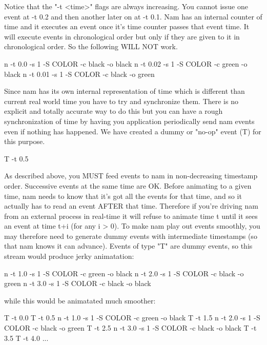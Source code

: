 Notice that the "-t <time>" flags are always increasing.  You cannot
issue one event at -t 0.2 and then another later on at -t 0.1.  Nam has
an internal counter of time and it executes an event once it's time
counter passes that event time.  It will execute events in chronological
order but only if they are given to it in chronological order.  So the
following WILL NOT work.
\begin{program}
n -t 0.0 -s 1 -S COLOR -c black -o black
n -t 0.02 -s 1 -S COLOR -c green -o black
n -t 0.01 -s 1 -S COLOR -c black -o green
\end{program}

Since nam has its own internal representation of time which is different
than current real world time you have to try and synchronize them.
There is no explicit and totally accurate way to do this but you can
have a rough synchronization of time by having you application
periodically send nam events even if nothing has happened. We have 
created a dummy or "no-op" event (T) for this purpose.
\begin{program}
T -t 0.5
\end{program}

As described above, you MUST feed events to nam in non-decreasing
timestamp order. Successive events at the same time are OK. 
Before animating to a given time, nam needs to know that it's got all
the events for that time, and so it actually has to read an event
AFTER that time.  Therefore if you're driving nam from an external
process in real-time it will refuse to animate time t until it sees an
event at time t+i (for any i > 0).  To make nam play out events
smoothly, you may therefore need to generate dummy events with
intermediate timestamps (so that nam knows it can advance).  Events of
type "T" are dummy events, so this stream would produce jerky
animatation:

\begin{program}
n -t 1.0 -s 1 -S COLOR -c green -o black
n -t 2.0 -s 1 -S COLOR -c black -o green
n -t 3.0 -s 1 -S COLOR -c black -o black
\end{program}

while this would be animatated much smoother:

\begin{program}
T -t 0.0
T -t 0.5
n -t 1.0 -s 1 -S COLOR -c green -o black
T -t 1.5
n -t 2.0 -s 1 -S COLOR -c black -o green
T -t 2.5
n -t 3.0 -s 1 -S COLOR -c black -o black
T -t 3.5
T -t 4.0
...
\end{program}

